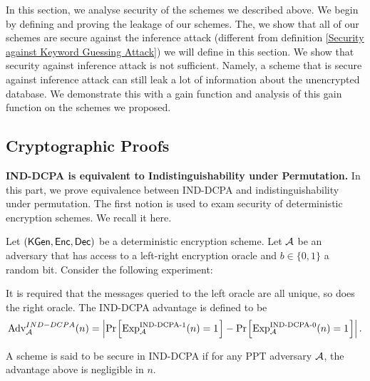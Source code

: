 In this section, we analyse security of the schemes we described above. We begin by defining and proving the leakage of our schemes. The, we show that all of our schemes are secure against the inference attack (different from definition \ref{Security against Keyword Guessing Attack}) we will define in this section. We show that security against inference attack is not sufficient. Namely, a scheme that is secure against inference attack can still leak a lot of information about the unencrypted database. We demonstrate this with a gain function and analysis of this gain function on the schemes we proposed.




\subsection{Cryptographic Proofs}
\textbf{IND-DCPA is equivalent to Indistinguishability under Permutation.} In this part, we prove equivalence between IND-DCPA and indistinguishability under permutation. The first notion is used to exam security of deterministic encryption schemes. We recall it here.

\begin{definition}
Let $(\mathsf{KGen}, \mathsf{Enc}, \mathsf{Dec})$ be a deterministic encryption scheme. Let $\mathcal{A}$ be an adversary that has access to a left-right encryption oracle and $b \in \{0,1\}$ a random bit. Consider the following experiment:

\begin{pchstack}[center]
\end{pchstack}

It is required that the messages queried to the left oracle are all unique, so does the right oracle. The IND-DCPA advantage is defined to be
\begin{equation}
\advantage_{\adv}^{IND-DCPA}(n) = \left| \prob{\text{Exp}_{\adv}^{\text{IND-DCPA-1}}(n) = 1} - \prob{\text{Exp}_{\adv}^{\text{IND-DCPA-0}}(n) = 1} \right|.
\end{equation}

A scheme is said to be secure in IND-DCPA if for any PPT adversary $\mathcal{A}$, the advantage above is negligible in $n$.
\end{definition}


